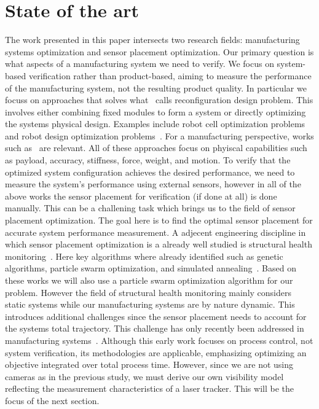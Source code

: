 \documentclass{svproc}
\begin{document}
\section{State of the art}
The work presented in this paper intersects two research fields: manufacturing systems optimization and sensor placement optimization.
Our primary question is what aspects of a manufacturing system we need to verify.
We focus on system-based verification rather than product-based, aiming to measure the performance of the manufacturing system, not the resulting product quality.
In particular we focuss on approaches that solves what~\cite{reconfigurable_production} calls reconfiguration design problem.
This involves either combining fixed modules to form a system or directly optimizing the systems physical design.
Examples include robot cell optimization problems~\cite{previous_work, stiffness_placement} and robot design optimization problems~\cite{task_synthesis, ad-hoc_manipulator, multi_objective}.
For a manufacturing perspective, works such as~\cite{johannes_1, johannes_2} are relevant.
All of these approaches focus on phyiscal capabilities such as payload, accuracy, stiffness, force, weight, and motion.
To verify that the optimized system configuration achieves the desired performance, we need to measure the system's performance using external sensors,
however in all of the above works the sensor placement for verification (if done at all) is done manually.
This can be a challening task which brings us to the field of sensor placement optimization.
The goal here is to find the optimal sensor placement for accurate system performance measurement.
A adjecent engineering discipline in which sensor placement optimization is a already well studied is structural health monitoring~\cite{shms}.
Here key algorithms where already identified such as genetic algorithms, particle swarm optimization, and simulated annealing~\cite{shms}.
Based on these works we will also use a particle swarm optimization algorithm for our problem.
However the field of structural health monitoring mainly considers static systems while our manufacturing systems are by nature dynamic.
This introduces additional challenges since the sensor placement needs to account for the systems total trajectory.
This challenge has only recently been addressed in manufacturing systems~\cite{ieee_sensors}. Although this early work focuses on process control, not system verification, its methodologies are applicable,
emphasizing optimizing an objective integrated over total process time.
However, since we are not using cameras as in the previous study, we must derive our own visibility model reflecting the measurement characteristics of a laser tracker.
This will be the focus of the next section.
\end{document}
